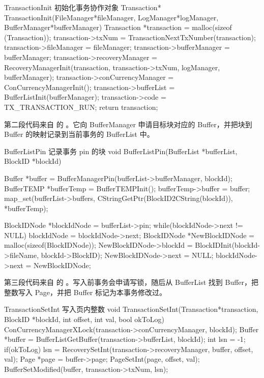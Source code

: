 \begin{dbcode}{TransactionInit 初始化事务协作对象}
Transaction* TransactionInit(FileManager*fileManager,
                             LogManager*logManager,
                             BufferManager*bufferManager){
    Transaction *transaction = malloc(sizeof (Transaction));
    transaction->txNum = TransactionNextTxNumber(transaction);
    transaction->fileManager = fileManager;
    transaction->bufferManager = bufferManager;
    transaction->recoveryManager =
        RecoveryManagerInit(transaction, transaction->txNum,
                            logManager, bufferManager);
    transaction->conCurrencyManager = ConCurrencyManagerInit();
    transaction->bufferList = BufferListInit(bufferManager);
    transaction->code = TX_TRANSACTION_RUN;
    return transaction;
}
\end{dbcode}

第二段代码来自  的 。它向 BufferManager 申请目标块对应的 Buffer，并把块到 Buffer 的映射记录到当前事务的 BufferList 中。

\begin{dbcode}{BufferListPin 记录事务 pin 的块}
void BufferListPin(BufferList *bufferList, BlockID *blockId){
    Buffer *buffer = BufferManagerPin(bufferList->bufferManager, blockId);
    BufferTEMP *bufferTemp = BufferTEMPInit();
    bufferTemp->buffer = buffer;
    map_set(bufferList->buffers,
            CStringGetPtr(BlockID2CString(blockId)),
            *bufferTemp);

    BlockIDNode *blockIdNode = bufferList->pin;
    while(blockIdNode->next != NULL){
        blockIdNode = blockIdNode->next;
    }
    BlockIDNode *NewBlockIDNode = malloc(sizeof(BlockIDNode));
    NewBlockIDNode->blockId = BlockIDInit(blockId->fileName,
                                          blockId->BlockID);
    NewBlockIDNode->next = NULL;
    blockIdNode->next = NewBlockIDNode;
}
\end{dbcode}

第三段代码来自  的 。写入前事务会申请写锁，随后从 BufferList 找到 Buffer，把整数写入 Page，并把 Buffer 标记为本事务修改过。

\begin{dbcode}{TransactionSetInt 写入页内整数}
void TransactionSetInt(Transaction*transaction, BlockID *blockId,
                       int offset, int val, bool okToLog){
    ConCurrencyManagerXLock(transaction->conCurrencyManager, blockId);
    Buffer *buffer = BufferListGetBuffer(transaction->bufferList, blockId);
    int lsn = -1;
    if(okToLog){
        lsn = RecoverySetInt(transaction->recoveryManager,
                             buffer, offset, val);
    }
    Page *page = buffer->page;
    PageSetInt(page, offset, val);
    BufferSetModified(buffer, transaction->txNum, lsn);
}
\end{dbcode}

